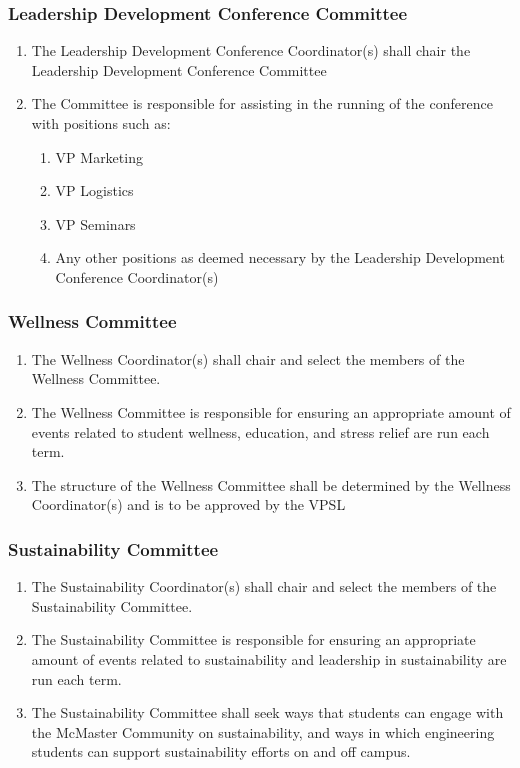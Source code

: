 \subsubsection{Leadership Development Conference Committee}
\label{leadership-development-conference-committee}
\begin{enumerate}
 \item
  The Leadership Development Conference Coordinator(s) shall chair the Leadership Development Conference Committee
 \item
  The Committee is responsible for assisting in the running of the conference with positions such as:

  \begin{enumerate}
   \item
    VP Marketing
   \item
    VP Logistics
   \item
    VP Seminars
   \item
    Any other positions as deemed necessary by the Leadership Development Conference Coordinator(s)

  \end{enumerate}
\end{enumerate}

\subsubsection{Wellness Committee}
\label{wellness-committee}
\begin{enumerate}
 \item
  The Wellness Coordinator(s) shall chair and select the members of the Wellness Committee.
 \item
  The Wellness Committee is responsible for ensuring an appropriate amount of events related to student wellness, education, and stress relief are run each term.
 \item
  The structure of the Wellness Committee shall be determined by the Wellness Coordinator(s) and is to be approved by the VPSL

\end{enumerate}

\subsubsection{Sustainability Committee}
\label{sustainability-committee}
\begin{enumerate}
 \item
  The Sustainability Coordinator(s) shall chair and select the members of the Sustainability Committee.
 \item
  The Sustainability Committee is responsible for ensuring an appropriate amount of events related to sustainability and leadership in sustainability are run each term.
 \item
  The Sustainability Committee shall seek ways that students can engage with the McMaster Community on sustainability, and ways in which engineering students can support sustainability efforts on and off campus.
\end{enumerate}

